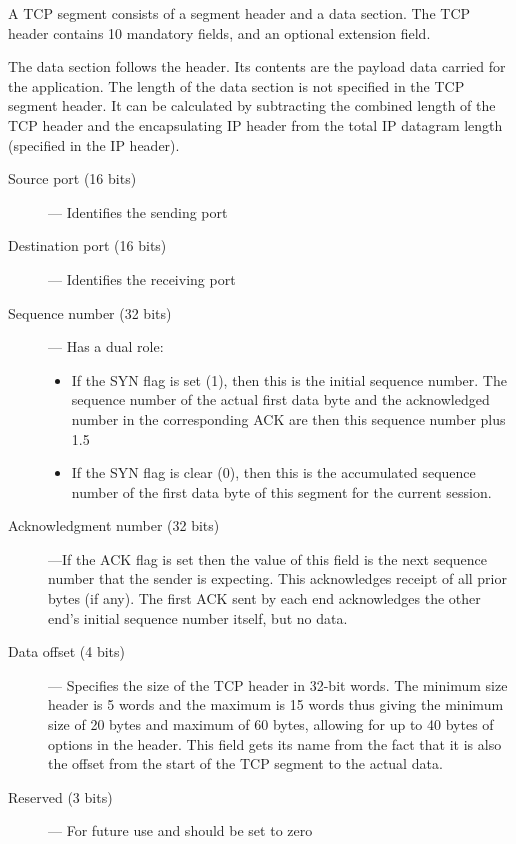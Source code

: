 \documentclass[12pt]{article}
\theoremstyle{definition}
\begin{document}
			A TCP segment consists of a segment header and a data section. The TCP header contains 10 mandatory fields, and an optional extension field.
			
			The data section follows the header. Its contents are the payload data carried for the application. The length of the data section is not specified in the TCP segment header. It can be calculated by subtracting the combined length of the TCP header and the encapsulating IP header from the total IP datagram length (specified in the IP header). 
			
			
			\begin{description}
				\item[Source port (16 bits)] --- Identifies the sending port
				\item[Destination port (16 bits)] --- Identifies the receiving port
				\item[Sequence number (32 bits)] --- 
					Has a dual role: 
					\begin{itemize}
						\item If the SYN flag is set (1), then this is the initial sequence number. The sequence number of the actual first data byte and the acknowledged number in the corresponding ACK are then this sequence number plus 1.5
						
						\item If the SYN flag is clear (0), then this is the accumulated sequence number of the first data byte of this segment for the current session.
					\end{itemize}
				\item [Acknowledgment number (32 bits)] ---If the ACK flag is set then the value of this field is the next sequence number that the sender is expecting. This acknowledges receipt of all prior bytes (if any). The first ACK sent by each end acknowledges the other end's initial sequence number itself, but no data.
				
				\item [Data offset (4 bits)] ---
				Specifies the size of the TCP header in 32-bit words. The minimum size header is 5 words and the maximum is 15 words thus giving the minimum size of 20 bytes and maximum of 60 bytes, allowing for up to 40 bytes of options in the header. This field gets its name from the fact that it is also the offset from the start of the TCP segment to the actual data.
				
				\item [Reserved (3 bits)] --- 
				For future use and should be set to zero
				

\end{description}
\end{document}
